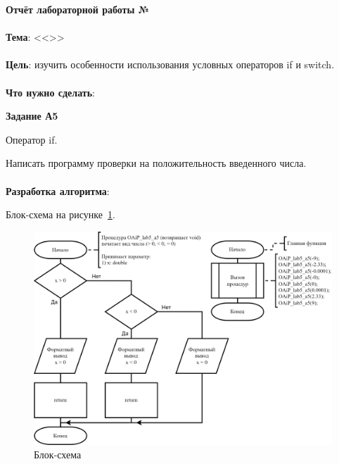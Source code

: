 \documentclass[12pt, a4paper, simple]{eskdtext}
\def \gpiDocTopic {Отчёт лабораторной работы №\gpiDocNum}
\begin{document}



\begin{center}
    \textbf{\gpiDocTopic}
\end{center}

\paragraph{} \textbf{Тема}: <<\gpiTopicRep>>

\paragraph{} \textbf{Цель}:
изучить особенности использования условных операторов if и switch.

\paragraph{} \textbf{Что нужно сделать}:

\begin{center}
    \textbf{Задание А5}
\end{center}

Оператор if.

Написать программу проверки на положительность введенного числа.

\paragraph{} \textbf{Разработка алгоритма}:

Блок-схема на рисунке~\ref{fig:a5}.

\begin{figure}[!h]
    \centering
    \includegraphics[]
    {../sources/flowcharts/OAiP_lab5_a5.png}
    \caption{Блок-схема}
    \label{fig:a5}
\end{figure}
\end{document}
